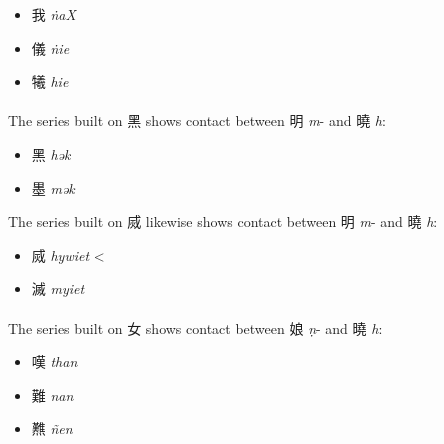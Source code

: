 \begin{itemize}\item
{\Large{我}}  \emph{ṅaX} %
\item
{\Large{儀}}  \emph{ṅie} %
\item
{\Large{犧}}  \emph{hie} %
\end{itemize}

\paragraph{}
The series built on 黑 
shows contact between 明 \textit{m}- and 曉 \emph{h}:


\begin{itemize}\item
{\Large{黑}}  \emph{hək} %
\item
{\Large{墨}} \emph{mək} %
\end{itemize}

\vspace{3mm}

The series built on 烕 
likewise 
shows contact 
between 明 \textit{m}- and 曉 \emph{h}:

\begin{itemize}\item
{\Large{烕}} \emph{hywiet} \textless{} {} %
\item
{\Large{滅}} \emph{myiet} %
\end{itemize}

\paragraph{}
The series built on 女 
shows contact between 娘 \textit{ṇ}- and 曉 \emph{h}:


\begin{itemize}\item
{\Large{嘆}}  \emph{than} %
\item
{\Large{難}}  \emph{nan} %
\item
{\Large{㸐}}  \emph{ñen} %
\end{itemize}



